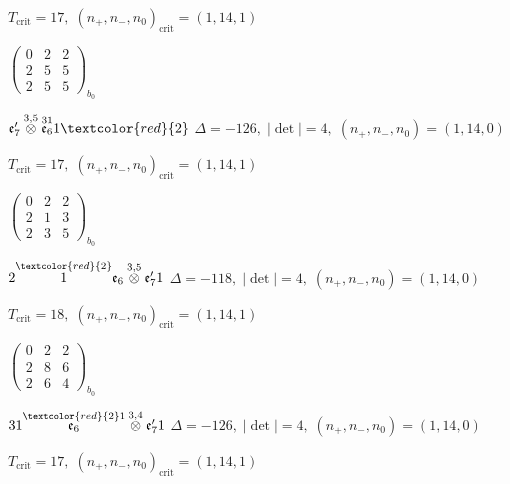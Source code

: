 \documentclass[10pt]{article}
\begin{document}
\hspace{1em}$T_{\text{crit}}=17,\; (n_+,n_-,n_0)_{\text{crit}}=(1,14,1)$

\hspace{2em}$\left(\begin{smallmatrix}0 & 2 & 2 \\ 2 & 5 & 5 \\ 2 & 5 & 5\end{smallmatrix}\right)_{\!b_0}$

\smallskip

$\mathfrak{e}_7'\overset{3,5}{\otimes}\overset{31}{\mathfrak{e}_6}1\textcolor{red}{2}$ \quad $\Delta=-126,\; |\det|=4,\; (n_+,n_-,n_0)=(1,14,0)$

\hspace{1em}$T_{\text{crit}}=17,\; (n_+,n_-,n_0)_{\text{crit}}=(1,14,1)$

\hspace{2em}$\left(\begin{smallmatrix}0 & 2 & 2 \\ 2 & 1 & 3 \\ 2 & 3 & 5\end{smallmatrix}\right)_{\!b_0}$

\smallskip

$2\overset{\textcolor{red}{2}}{1}\mathfrak{e}_6\overset{3,5}{\otimes}\mathfrak{e}_7'1$ \quad $\Delta=-118,\; |\det|=4,\; (n_+,n_-,n_0)=(1,14,0)$

\hspace{1em}$T_{\text{crit}}=18,\; (n_+,n_-,n_0)_{\text{crit}}=(1,14,1)$

\hspace{2em}$\left(\begin{smallmatrix}0 & 2 & 2 \\ 2 & 8 & 6 \\ 2 & 6 & 4\end{smallmatrix}\right)_{\!b_0}$

\smallskip

$31\overset{\textcolor{red}{2}1}{\mathfrak{e}_6}\overset{3,4}{\otimes}\mathfrak{e}_7'1$ \quad $\Delta=-126,\; |\det|=4,\; (n_+,n_-,n_0)=(1,14,0)$

\hspace{1em}$T_{\text{crit}}=17,\; (n_+,n_-,n_0)_{\text{crit}}=(1,14,1)$
\end{document}
